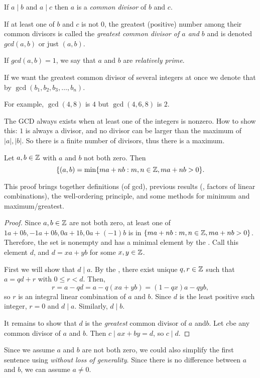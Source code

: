 \documentclass{ximera}
\begin{document}
\begin{defn}\label{defn:gcd} 
  If $a\mid b$ and $a\mid c$ then $a$ is a \emph{common divisor} of $b$ and $c$.

  If at least one of $b$ and $c$ is not $0$, the greatest (positive) number among their common divisors  is called the \emph{greatest common divisor of $a$ and $b$} and is denoted $gcd(a,b)$ or just $(a,b)$. 
 
  If $gcd(a,b)=1$, we say that $a$ and $b$ are \emph{relatively prime}.

  If we want the greatest common divisor of several integers at once we denote that by $\gcd(b_1,b_2,b_3,\dots,b_n)$.
\end{defn}

For example, $\gcd(4,8)$ is $4$ but $\gcd(4,6,8)$ is $2$.

The GCD always exists when at least one of the integers is nonzero. How to show this: $1$ is always a divisor, and no divisor can be larger than the maximum of $|a|,|b|$. So there is a finite number of divisors, thus there is a maximum.


\begin{prop*}[Proposition 1.11]\label{Bezout}
 Let $a, b\in \mathbb Z$ with $a$ and $b$ not both zero. Then 
 \[\{(a,b)=\min\{ma+nb:m,n\in\mathbb Z, ma+nb>0\}.\]
\end{prop*}
This proof brings together definitions (of gcd), previous results (, factors of linear combinations), the well-ordering principle, and some methods for minimum and maximum/greatest.
\begin{proof}
 Since $a,b\in\mathbb Z$ are not both zero, at least one of $1a+0b, -1a+0b, 0a+1b, 0a+(-1)b$ is in $\{ma+nb:m,n\in\mathbb Z, ma+nb>0\}$. Therefore, the set is nonempty and has a minimal element by the . Call this element $d$, and $d=xa+yb$ for some $x,y\in \mathbb Z$.
 
First we will show that $d\mid a$. By the , there exist unique $q,r\in\mathbb Z$ such that $a=qd+r$ with $0\leq r<d$. Then, \[r=a-qd=a-q(xa+yb)=(1-qx)a-qyb,\] so $r$ is an integral linear combination of $a$ and $b$.  Since $d$ is the least positive such integer, $r=0$ and $d\mid a$. Similarly, $d\mid b$. 

It remains to show that $d$ is the \emph{greatest} common divisor of $a$ and$b$. Let $c$be any common divisor of $a$  and $b$. Then $c\mid ax+by=d$, so $c\mid d$.
\end{proof}

Since we assume $a$ and $b$ are not both zero, we could also simplify the first sentence using \emph{without loss of generality}. Since there is no difference between $a$ and $b$, we can assume $a\neq0$.
\end{document}
